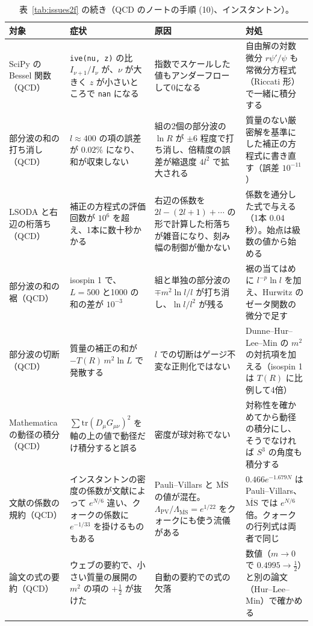 \documentclass[a4paper,10pt]{ltjsarticle}
\begin{document}
\begin{table}[tbp]
\centering\footnotesize
\caption{表~\ref{tab:issues2f} の続き（QCD のノートの手順 (10)、インスタントン）。}
\label{tab:issues2g}
\begin{tabularx}{\linewidth}{>{\raggedright\arraybackslash}p{2.4cm}>{\raggedright\arraybackslash}X>{\raggedright\arraybackslash}X>{\raggedright\arraybackslash}X}
\toprule
\textbf{対象} & \textbf{症状} & \textbf{原因} & \textbf{対処} \\
\midrule
SciPy の Bessel 関数（QCD） & \texttt{ive(nu, z)} の比 $I_{\nu+1}/I_\nu$ が、$\nu$ が大きく $z$ が小さいところで \texttt{nan} になる & 指数でスケールした値もアンダーフローして0になる & 自由解の対数微分 $r\psi'/\psi$ も常微分方程式（Riccati 形）で一緒に積分する \\
部分波の和の打ち消し（QCD） & $l\approx400$ の項の誤差が $0.02\%$ になり、和が収束しない & 組の2個の部分波の $\ln R$ が $\pm6$ 程度で打ち消し、倍精度の誤差が縮退度 $4l^2$ で拡大される & 質量のない厳密解を基準にした補正の方程式に書き直す（誤差 $10^{-11}$） \\
LSODA と右辺の桁落ち（QCD） & 補正の方程式の評価回数が $10^6$ を超え、1本に数十秒かかる & 右辺の係数を $2l-(2l+1)+\cdots$ の形で計算した桁落ちが雑音になり、刻み幅の制御が働かない & 係数を通分した式で与える（1本 0.04 秒）。始点は級数の値から始める \\
部分波の和の裾（QCD） & isospin 1 で、$L=500$ と1000 の和の差が $10^{-3}$ & 組と単独の部分波の $\mp m^2\ln l/l$ が打ち消し、$\ln l/l^2$ が残る & 裾の当てはめに $l^{-p}\ln l$ を加え、Hurwitz のゼータ関数の微分で足す \\
部分波の切断（QCD） & 質量の補正の和が $-T(R)\,m^2\ln L$ で発散する & $l$ での切断はゲージ不変な正則化ではない & Dunne--Hur--Lee--Min の $m^2$ の対抗項を加える（isospin 1 は $T(R)$ に比例して4倍） \\
Mathematica の動径の積分（QCD） & $\sum\mathrm{tr}(D_\mu G_{\mu\nu})^2$ を軸の上の値で動径だけ積分すると誤る & 密度が球対称でない & 対称性を確かめてから動径の積分にし、そうでなければ $S^3$ の角度も積分する \\
文献の係数の規約（QCD） & インスタントンの密度の係数が文献によって $e^{N/6}$ 違い、クォークの係数に $e^{-1/33}$ を掛けるものもある & Pauli--Villars と $\overline{\mathrm{MS}}$ の値が混在。$\Lambda_{\mathrm{PV}}/\Lambda_{\overline{\mathrm{MS}}}=e^{1/22}$ をクォークにも使う流儀がある & $0.466e^{-1.679N}$ は Pauli--Villars、$\overline{\mathrm{MS}}$ では $e^{N/6}$ 倍。クォークの行列式は両者で同じ \\
論文の式の要約（QCD） & ウェブの要約で、小さい質量の展開の $m^2$ の項の $+\frac12$ が抜けた & 自動の要約での式の欠落 & 数値（$m\to0$ で $0.4995\to\frac12$）と別の論文（Hur--Lee--Min）で確かめる \\
\bottomrule
\end{tabularx}
\end{table}
\end{document}
